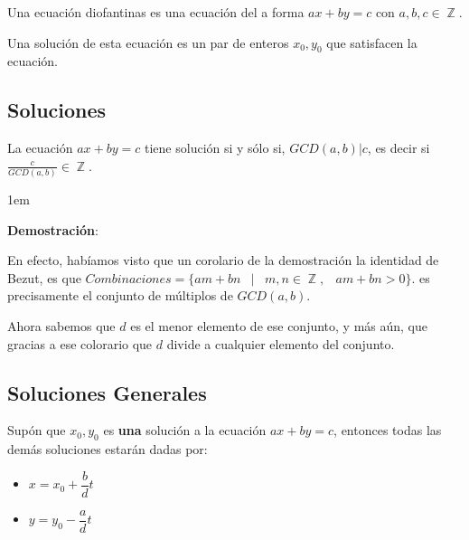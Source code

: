 \documentclass[12pt, fleqn]{report}                             %
\newenvironment{SmallIndentation}[1][0.75em]                    %
    {\begin{adjustwidth}{#1}{}\begin{footnotesize}}                 %
    {\end{footnotesize}\end{adjustwidth}}                           %
\DeclareMathOperator \Space {\quad}                             %
\DeclareMathOperator \MiniSpace {\;}                            %
\newcommand \Such {\MiniSpace|\MiniSpace}                       %
\DeclareMathOperator \Integers  {\mathbb{Z}}                     %
\begin{document}
            Una ecuación diofantinas es una ecuación del a forma $ax+by=c$ con
            $a,b,c \in \Integers$.

            Una solución de esta ecuación es un par de enteros $x_0, y_0$
            que satisfacen la ecuación.


        \subsection{Soluciones}

            La ecuación $ax+by = c$ tiene solución si y sólo si, $GCD(a,b)|c$, es decir
            si $\frac{c}{GCD(a,b)} \in \Integers$.

            \begin{SmallIndentation}[1em]
                \textbf{Demostración}:

                En efecto, habíamos visto que un corolario de la demostración la identidad
                de Bezut, es que
                $Combinaciones = \{ am+bn \Such m, n \in \Integers, \MiniSpace am+bn > 0 \}$.
                es precisamente el conjunto de múltiplos de $GCD(a,b)$.

                Ahora sabemos que $d$ es el menor elemento de ese conjunto, y más aún,
                que gracias a ese colorario que $d$ divide a cualquier elemento del conjunto.

            \end{SmallIndentation}


        \clearpage
        \subsection{Soluciones Generales}

            Supón que $x_0, y_0$ es \textbf{una} solución a la ecuación $ax+ by = c$,
            entonces todas las demás soluciones estarán dadas por:

            \begin{itemize}
                \item $x = x_0 + \dfrac{b}{d}t$
                \item $y = y_0 - \dfrac{a}{d}t$
            \end{itemize}
\end{document}
